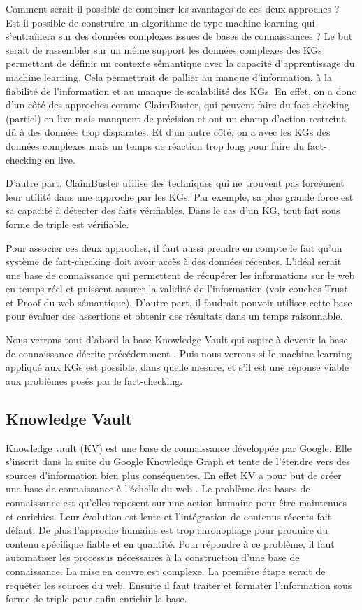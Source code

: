 Comment serait-il possible de combiner les avantages de ces deux approches ? Est-il possible de construire un algorithme de type machine learning qui s'entraînera sur des données complexes issues de bases de connaissances ? Le but serait de rassembler sur un même support les données complexes des KGs permettant de définir un contexte sémantique avec la capacité d'apprentissage du machine learning. Cela permettrait de pallier au manque d'information, à la fiabilité de l'information et au manque de scalabilité des KGs. En effet, on a donc d'un côté des approches comme ClaimBuster, qui peuvent faire du fact-checking (partiel) en live mais manquent de précision et ont un champ d'action restreint dû à des données trop disparates. Et d'un autre côté, on a avec les KGs des données complexes mais un temps de réaction trop long pour faire du fact-checking en live.

D'autre part, ClaimBuster utilise des techniques qui ne trouvent pas forcément leur utilité dans une approche par les KGs. Par exemple, sa plus grande force est sa capacité à détecter des faits vérifiables. Dans le cas d'un KG, tout fait sous forme de triple est vérifiable.

Pour associer ces deux approches, il faut aussi prendre en compte le fait qu'un système de fact-checking doit avoir accès à des données récentes. L'idéal serait une base de connaissance qui permettent de récupérer les informations sur le web en temps réel et puissent assurer la validité de l'information (voir couches Trust et Proof du web sémantique). D'autre part, il faudrait pouvoir utiliser cette base pour évaluer des assertions et obtenir des résultats dans un temps raisonnable.

Nous verrons tout d'abord la base Knowledge Vault qui aspire à devenir la base de connaissance décrite précédemment \cite{dong2014knowledge}. Puis nous verrons si le machine learning appliqué aux KGs est possible, dans quelle mesure, et s'il est une réponse viable aux problèmes posés par le fact-checking.

\subsection{Knowledge Vault}

Knowledge vault (KV) est une base de connaissance développée par Google. Elle s'inscrit dans la suite du Google Knowledge Graph et tente de l'étendre vers des sources d'information bien plus conséquentes. En effet KV a pour but de créer une base de connaissance à l'échelle du web \cite{dong2014knowledge}. Le problème des bases de connaissance est qu'elles reposent sur une action humaine pour être maintenues et enrichies. Leur évolution est lente et l'intégration de contenus récents fait défaut. De plus l'approche humaine est trop chronophage pour produire du contenu spécifique fiable et en quantité. Pour répondre à ce problème, il faut automatiser les processus nécessaires à la construction d'une base de connaissance. La mise en oeuvre est complexe. La première étape serait de requêter les sources du web. Ensuite il faut traiter et formater l'information sous forme de triple pour enfin enrichir la base.

